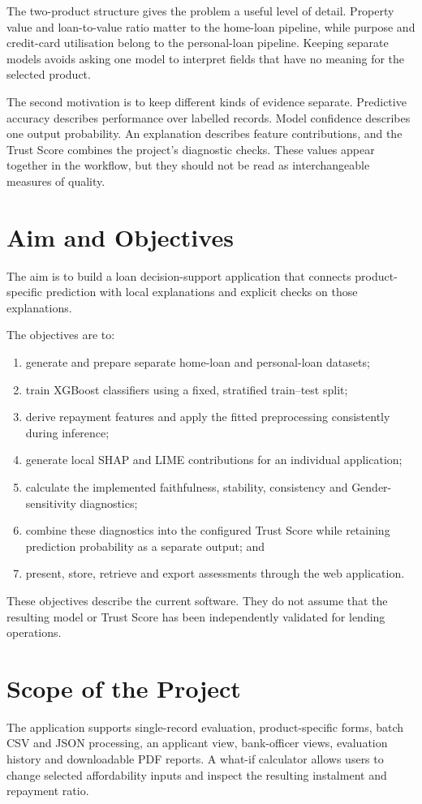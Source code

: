 The two-product structure gives the problem a useful level of detail. Property value and loan-to-value ratio matter to the home-loan pipeline, while purpose and credit-card utilisation belong to the personal-loan pipeline. Keeping separate models avoids asking one model to interpret fields that have no meaning for the selected product.

The second motivation is to keep different kinds of evidence separate. Predictive accuracy describes performance over labelled records. Model confidence describes one output probability. An explanation describes feature contributions, and the Trust Score combines the project's diagnostic checks. These values appear together in the workflow, but they should not be read as interchangeable measures of quality.

\section{Aim and Objectives}
The aim is to build a loan decision-support application that connects product-specific prediction with local explanations and explicit checks on those explanations.

The objectives are to:
\begin{enumerate}
\item generate and prepare separate home-loan and personal-loan datasets;
\item train XGBoost classifiers using a fixed, stratified train--test split;
\item derive repayment features and apply the fitted preprocessing consistently during inference;
\item generate local SHAP and LIME contributions for an individual application;
\item calculate the implemented faithfulness, stability, consistency and Gender-sensitivity diagnostics;
\item combine these diagnostics into the configured Trust Score while retaining prediction probability as a separate output; and
\item present, store, retrieve and export assessments through the web application.
\end{enumerate}

These objectives describe the current software. They do not assume that the resulting model or Trust Score has been independently validated for lending operations.

\section{Scope of the Project}
The application supports single-record evaluation, product-specific forms, batch CSV and JSON processing, an applicant view, bank-officer views, evaluation history and downloadable PDF reports. A what-if calculator allows users to change selected affordability inputs and inspect the resulting instalment and repayment ratio.

